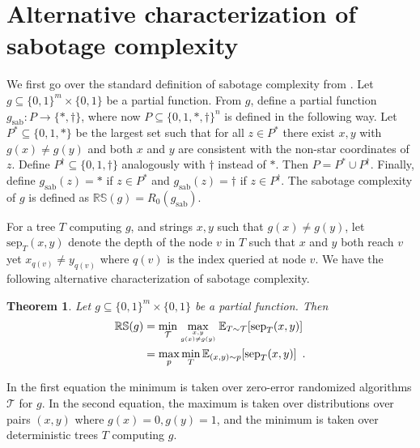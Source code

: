 \documentclass[11pt]{article}
\numberwithin{equation}{section}
\newtheorem{theorem}{Theorem}[section]
\theoremstyle{definition}
\theoremstyle{plain}
\newcommand{\clT}{\mathcal{T}}
\newcommand{\RS}{\mathbb{RS}}
\newcommand{\sep}{\mathrm{sep}}
\newcommand{\sab}{\mathrm{sab}}
\newcommand{\E}{\mathbb{E}}
\begin{document}
\section{Alternative characterization of sabotage complexity}
\label{app:sabotage}
We first go over the standard definition of sabotage complexity from \cite{DBLP:conf/icalp/Ben-DavidK16}.
Let $g \subseteq \{0,1\}^m \times \{0,1\}$ be a partial function.  From $g$, define a partial 
function $g_{\sab} :  P \rightarrow \{\ast,\dagger\}$, where now $P \subseteq \{0,1,\ast, \dagger\}^n$ is defined in the following way.  Let $P^{\ast} \subseteq \{0,1,\ast\}$ 
be the largest set such that for all $z \in P^{\ast}$ there exist $x,y$ with $g(x) \ne g(y)$ and both $x$ and $y$ are consistent with the non-star 
coordinates of $z$.  Define $P^{\dagger} \subseteq \{0,1,\dagger\}$ analogously with $\dagger$ instead of $\ast$.  Then $P = P^{\ast} \cup P^{\dagger}$.  Finally, define $g_{\sab}(z) = \ast$ if 
$z \in P^\ast$ and $g_{\sab}(z) = \dagger$ if $z \in P^{\dagger}$.  
The sabotage complexity of $g$ is defined as $\RS(g) = R_0(g_{\sab})$.  

For a tree $T$ computing $g$, and strings $x,y$ such that $g(x) \ne g(y)$, let $\sep_T(x,y)$ denote the depth of the 
node $v$ in $T$ such that $x$ and $y$ both reach $v$ yet $x_{q(v)} \ne y_{q(v)}$ where $q(v)$ is the index queried at node $v$.  
We have the following alternative characterization of sabotage complexity.

\begin{theorem}
\label{thm:alt_sabotage}
Let $g \subseteq \{0,1\}^m \times \{0,1\}$ be a partial function.  Then 
\begin{align*}
\RS(g) &= \min_\clT \max_{x,y \atop g(x) \ne g(y)} \E_{T \sim \clT} [\sep_T(x,y)] \\
&= \max_p \min_T \E_{(x,y) \sim p} [\sep_T(x,y)]\enspace .
\end{align*}
\end{theorem}
In the first equation the minimum is taken over zero-error randomized algorithms $\clT$ for $g$.  In the 
second equation, the maximum is taken over distributions over pairs $(x,y)$ where $g(x)=0, g(y)=1$, and 
the minimum is taken over deterministic trees $T$ computing $g$.
\end{document}
